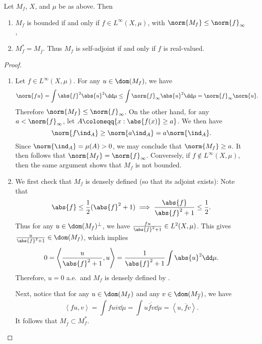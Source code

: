\documentclass[oneside,reqno,letterpaper]{amsart}
\begin{document}
\begin{proposition}
\label{thm:multiplication-operator-adjoint}
  Let \(M_f\), \(X\), and \(\mu\) be as above.
  Then 
  \begin{enumerate}[label=(\alph*)]
    \item \(M_f\) is bounded if and only if \(f \in L^{\infty}(X, \mu)\), with \(\norm{M_f} \leq \norm{f}_{\infty}\), 
    \item \(M_f^* = M_{\overline{f}}\). Thus \(M_f\) is self-adjoint if and only if \(f\) is real-valued. 
  \end{enumerate}
\end{proposition}
\begin{proof}~
\begin{enumerate}[label=(\alph*)]
  \item %
  Let \(f \in L^{\infty}(X, \mu)\). 
  For any \(u \in \dom(M_f)\), we have 
  \[
    \norm{f u}
    = \int \abs{f}^2 \abs{u}^2 \dd\mu
    \leq \int \norm{f}_{\infty} \abs{u}^2 \dd\mu   
    = \norm{f}_{\infty} \norm{u} . 
  \] 
  Therefore \(\norm{M_f} \leq \norm{f}_{\infty}\). 
  On the other hand, for any \(a < \norm{f}_{\infty}\), let \(A \coloneqq \{x: \abs{f(x)} \geq a\}\). 
  We then have 
  \[
  \norm{f \ind_{A}} \geq \norm{a \ind_{A}} = a \norm{\ind_{A}} . 
  \] 
  Since \(\norm{\ind_{A}} = \mu(A) > 0\), we may conclude that \(\norm{M_f}  \geq a\). 
  It then follows that \(\norm{M_f} = \norm{f}_{\infty}\). 
  Conversely, if \(f \not\in L^{\infty}(X, \mu)\), then the same argument shows that \(M_f\) is not bounded. 
  
  \item %
  We first check that \(M_f\) is densely defined (so that its adjoint exists): 
  Note that 
  \[
    \abs{f} \leq \frac{1}{2} ( \abs{f}^2 + 1 )  \implies  \frac{\abs{f}}{\abs{f}^2 + 1} \leq \frac{1}{2} . 
  \] 
  Thus for any \(u \in \dom(M_f)^\perp\), we have \(\frac{f u}{\abs{f}^2 + 1} \in L^2(X, \mu)\).
  This gives \(\frac{u}{\abs{f}^2 + 1} \in \dom(M_f)\), which implies 
  \[
    0 = \left< \frac{u}{\abs{f}^2 + 1}, u \right> = \frac{1}{\abs{f}^2 + 1} \int \abs{u}^2 \dd\mu. 
  \] 
  Therefore, \(u = 0\) a.e.\ and \(M_f\) is densely defined by . 

  Next, notice that for any \(u \in \dom(M_f)\) and any \(v \in \dom(M_{\overline{f}})\), we have
  \[
    \left< fu, v \right> 
    = \int fu \overline{v} \dd\mu
    = \int u \overline{\overline{f}v} \dd\mu
    = \left< u, \overline{f} v \right> . 
  \]
  It follows that \(M_{\overline{f}} \subset M_f^*\). 


\end{enumerate}
\end{proof}
\end{document}
